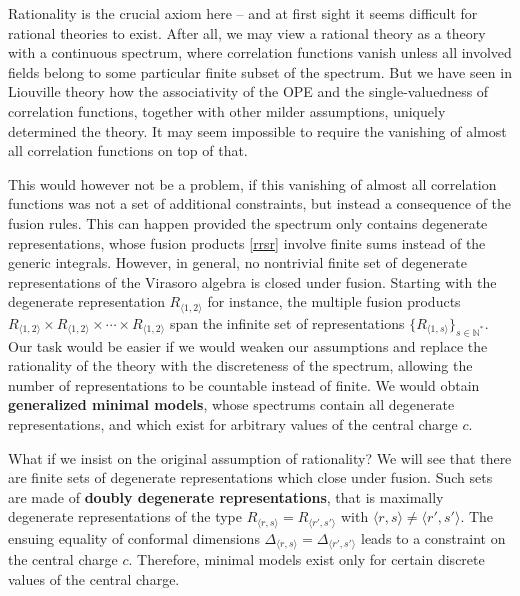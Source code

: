 \documentclass[12pt,a4paper,notitlepage]{report}
\numberwithin{equation}{section}
\theoremstyle{break}
\begin{document}
Rationality is the crucial axiom here -- and at first sight it seems difficult for rational theories to exist.
After all, we may view a rational theory as a theory with a continuous spectrum, where correlation functions vanish unless all involved fields belong to some particular finite subset of the spectrum.
But we have seen in Liouville theory how the associativity of the OPE and the single-valuedness of correlation functions, together with other milder assumptions, uniquely determined the theory.
It may seem impossible to require the vanishing of almost all correlation functions on top of that. 

This would however not be a problem, if this vanishing of almost all correlation functions was not a set of additional constraints, but instead a consequence of the fusion rules.
This can happen provided the spectrum only contains degenerate representations, whose fusion products \eqref{rrsr} involve finite sums instead of the generic integrals. 
However, in general, no nontrivial finite set of degenerate representations of the Virasoro algebra is closed under fusion.
Starting with the degenerate representation $R_{\langle 1,2 \rangle}$ for instance, the multiple fusion products $R_{\langle 1,2 \rangle}\times R_{\langle 1,2 \rangle}\times \cdots \times R_{\langle 1,2 \rangle}$ span the infinite set of representations $\{R_{\langle 1,s \rangle}\}_{s\in{\mathbb{N}}^*}$.
Our task would be easier if we would weaken our assumptions and replace the rationality of the theory with the discreteness of the spectrum, allowing the number of representations to be countable instead of finite.
We would obtain \textbf{\boldmath generalized minimal models}, whose spectrums contain all degenerate representations, and which exist for arbitrary values of the central charge $c$. 

What if we insist on the original assumption of rationality? We will see that there are finite sets 
of degenerate representations which close under fusion.
Such sets are made of
\textbf{\boldmath doubly degenerate representations}, that is maximally degenerate representations of the type $R_{\langle r,s \rangle}=R_{\langle r',s' \rangle}$ with $\langle r,s \rangle\neq \langle r',s' \rangle$.
The ensuing equality of conformal dimensions $\Delta_{\langle r,s \rangle}=\Delta_{\langle r',s' \rangle}$ leads to a constraint on the central charge $c$.
Therefore, minimal models exist only for certain discrete values of the central charge. 
\end{document}
